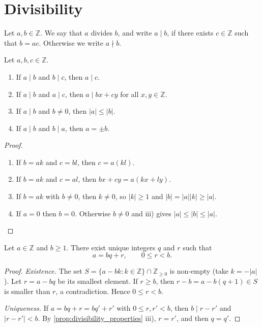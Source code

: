 \section{Divisibility}

\begin{definition}[Divisibility]\label{def:divisibility}
    Let $a,b \in \mathbb{Z}$. We say that $a$ divides $b$, and write $a \mid b$, if there exists $c \in \mathbb{Z}$ such that $b = ac$. Otherwise we write $a \nmid b$.
\end{definition}

\begin{proposition}\label{prop:divisibility_properties}
    Let $a,b,c \in \mathbb{Z}$.
    \begin{enumerate}[label={\upshape\roman*)}]
        \item If $a \mid b$ and $b \mid c$, then $a \mid c$.
        \item If $a \mid b$ and $a \mid c$, then $a \mid bx + cy$ for all $x,y \in \mathbb{Z}$.
        \item If $a \mid b$ and $b \neq 0$, then $|a| \le |b|$.
        \item If $a \mid b$ and $b \mid a$, then $a = \pm b$.
    \end{enumerate}
\end{proposition}
\begin{proof}
    \begin{enumerate}[label={\upshape\roman*)}]
        \item If $b = ak$ and $c = bl$, then $c = a(kl)$.
        \item If $b = ak$ and $c = al$, then $bx + cy = a(kx + ly)$.
        \item If $b = ak$ with $b \neq 0$, then $k \neq 0$, so $|k| \ge 1$ and $|b| = |a||k| \ge |a|$.
        \item If $a = 0$ then $b = 0$. Otherwise $b \neq 0$ and iii) gives $|a| \le |b| \le |a|$.
    \end{enumerate}
\end{proof}

\begin{theorem}\label{thm:euclidean_division}
    Let $a \in \mathbb{Z}$ and $b \ge 1$. There exist unique integers $q$ and $r$ such that
    \begin{equation*}
        a = bq + r, \qquad 0 \le r < b.
    \end{equation*}
\end{theorem}
\begin{proof}
    \emph{Existence.} The set $S = \{a - bk : k \in \mathbb{Z}\} \cap \mathbb{Z}_{\ge 0}$ is non-empty (take $k = -|a|$). Let $r = a - bq$ be its smallest element. If $r \ge b$, then $r - b = a - b(q+1) \in S$ is smaller than $r$, a contradiction. Hence $0 \le r < b$.

    \emph{Uniqueness.} If $a = bq + r = bq' + r'$ with $0 \le r, r' < b$, then $b \mid r - r'$ and $|r - r'| < b$. By \cref{prop:divisibility_properties} iii), $r = r'$, and then $q = q'$.
\end{proof}
